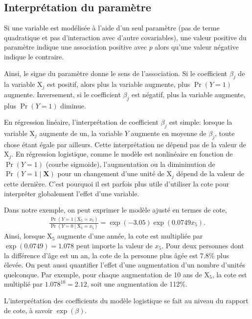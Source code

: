 \documentclass[
  11pt,
  letterpaper,
]{scrbook}
\theoremstyle{definition}
\theoremstyle{remark}
\begin{document}
\subsection{Interprétation du
paramètre}\label{interpruxe9tation-du-paramuxe8tre}

Si une variable est modélisée à l'aide d'un seul paramètre (pas de terme
quadratique et pas d'interaction avec d'autre covariables), une valeur
positive du paramètre indique une association positive avec \(p\) alors
qu'une valeur négative indique le contraire.

Ainsi, le signe du paramètre donne le sens de l'association. Si le
coefficient \(\beta_j\) de la variable \(\mathrm{X}_j\) est positif,
alors plus la variable augmente, plus \(\Pr(Y=1)\) augmente.
Inversement, si le coefficient \(\beta_j\) est négatif, plus la variable
augmente, plus \(\Pr(Y=1)\) diminue.

En régression linéaire, l'interprétation de coefficient \(\beta_j\) est
simple: lorsque la variable \(\mathrm{X}_j\) augmente de un, la variable
\(Y\) augmente en moyenne de \(\beta_j\), toute chose étant égale par
ailleurs. Cette interprétation ne dépend pas de la valeur de
\(\mathrm{X}_j\). En régression logistique, comme le modèle est
nonlinéaire en fonction de \(\Pr(Y=1)\) (courbe sigmoide),
l'augmentation ou la dimininution de \(\Pr(Y=1\mid \mathbf{X})\) pour un
changement d'une unité de \(\mathrm{X}_j\) dépend de la valeur de cette
dernière. C'est pourquoi il est parfois plus utile d'utiliser la cote
pour interpréter globalement l'effet d'une variable.

Dans notre exemple, on peut exprimer le modèle ajusté en termes de cote,
\begin{align*}
 \frac{\Pr(Y=1 \mid \mathrm{X}_5=x_5)}{\Pr(Y=0 \mid \mathrm{X}_5=x_5)} = \exp(-3.05)\exp(0.0749x_5).
\end{align*} Ainsi, lorsque \(\mathrm{X}_5\) augmente d'une année, la
cote est multipliée par \(\exp(0.0749) = 1.078\) peut importe la valeur
de \(x_5\). Pour deux personnes dont la différence d'âge est un an, la
cote de la personne plus âgée est 7.8\% plus élevée. On peut aussi
quantifier l'effet d'une augmentation d'un nombre d'unités quelconque.
Par exemple, pour chaque augmentation de 10 ans de \(\mathrm{X}_5\), la
cote est multiplié par \(1.078^{10} = 2.12\), soit une augmentation de
112\%.

L'interprétation des coefficients du modèle logistique se fait au niveau
du rapport de cote, à savoir \(\exp(\beta)\).
\end{document}
